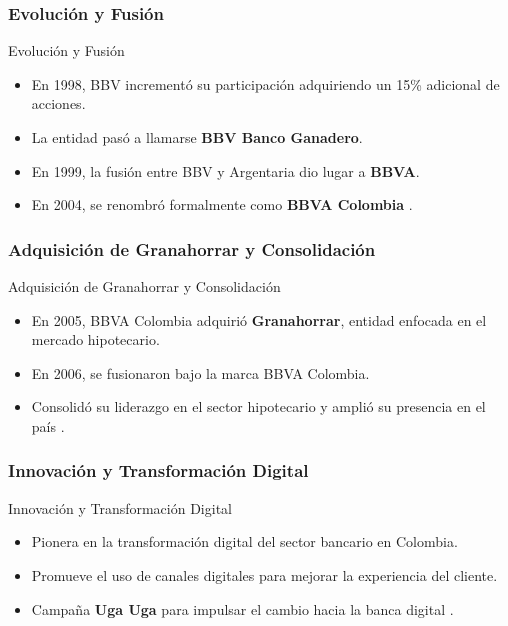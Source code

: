 \documentclass[aspectratio=169, xcolor={dvipsnames}, 10pt, spanish]{beamer}
\begin{document}
\subsubsection{Evolución y Fusión}
\begin{frame}{Evolución y Fusión}
    \begin{itemize}
        \item En 1998, BBV incrementó su participación adquiriendo un 15\% adicional de acciones.
        \item La entidad pasó a llamarse \textbf{BBV Banco Ganadero}.
        \item En 1999, la fusión entre BBV y Argentaria dio lugar a \textbf{BBVA}.
        \item En 2004, se renombró formalmente como \textbf{BBVA Colombia} \cite{2}.
    \end{itemize}
\end{frame}

\subsubsection{Adquisición de Granahorrar y Consolidación}
\begin{frame}{Adquisición de Granahorrar y Consolidación}
    \begin{itemize}
        \item En 2005, BBVA Colombia adquirió \textbf{Granahorrar}, entidad enfocada en el mercado hipotecario.
        \item En 2006, se fusionaron bajo la marca BBVA Colombia.
        \item Consolidó su liderazgo en el sector hipotecario y amplió su presencia en el país \cite{2}.
    \end{itemize}
\end{frame}

\subsubsection{Innovación y Transformación Digital}
\begin{frame}{Innovación y Transformación Digital}
    \begin{itemize}
        \item Pionera en la transformación digital del sector bancario en Colombia.
        \item Promueve el uso de canales digitales para mejorar la experiencia del cliente.
        \item Campaña \textbf{Uga Uga} para impulsar el cambio hacia la banca digital \cite{3}.
    \end{itemize}
\end{frame}
\end{document}
